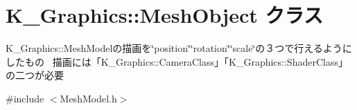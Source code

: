 \hypertarget{class_k___graphics_1_1_mesh_object}{}\section{K\+\_\+\+Graphics\+:\+:Mesh\+Object クラス}
\label{class_k___graphics_1_1_mesh_object}


K\+\_\+\+Graphics\+::\+Mesh\+Modelの描画を\char`\"{}position\char`\"{}\char`\"{}rotation\char`\"{}\char`\"{}scale\char`\"{}の３つで行えるようにしたもの~\newline
描画には「\+K\+\_\+\+Graphics\+::\+Camera\+Class」「\+K\+\_\+\+Graphics\+::\+Shader\+Class」の二つが必要  




{\ttfamily \#include $<$Mesh\+Model.\+h$>$}

